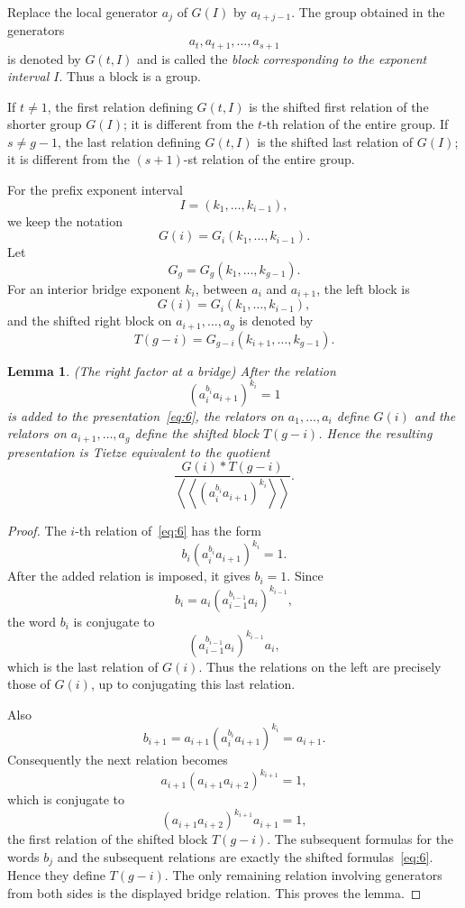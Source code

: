 \documentclass{article}
\newtheorem{lm}[theorem]{Lemma}
\begin{document}
Replace the local generator $a_j$ of $G(I)$ by $a_{t+j-1}$.  The group
obtained in the generators
\[
 a_t,a_{t+1},\ldots,a_{s+1}
\]
is denoted by $G(t,I)$ and is called the \emph{block corresponding to the
exponent interval $I$}.  Thus a block is a group.

If $t\ne1$, the first relation defining $G(t,I)$ is the shifted first
relation of the shorter group $G(I)$; it is different from the $t$-th
relation of the entire group. 
If $s\ne g-1$, the last relation defining $G(t,I)$ is the shifted last
relation of $G(I)$; it is different from the $(s+1)$-st relation of the entire
group. 

For the prefix exponent interval
\[
 I=(k_1,\ldots,k_{i-1}),
\]
we keep the notation
\[
 G(i)=G_i(k_1,\ldots,k_{i-1}).
\]
Let
\[
 G_g=G_g(k_1,\ldots,k_{g-1}).
\]
For an interior bridge exponent $k_i$, between $a_i$ and $a_{i+1}$, the
left block is
\[
 G(i)=G_i(k_1,\ldots,k_{i-1}),
\]
and the shifted right block on $a_{i+1},\ldots,a_g$ is denoted by
\[
 T(g-i)=G_{g-i}(k_{i+1},\ldots,k_{g-1}).
\]


\begin{lm} (The right factor at a bridge)
After the relation
\[
 (a_i^{b_i}a_{i+1})^{k_i}=1
\]
is added to the presentation~\eqref{eq:6}, the relators on
$a_1,\ldots,a_i$ define $G(i)$ and the relators on
$a_{i+1},\ldots,a_g$ define the shifted block $T(g-i)$.  Hence the
resulting presentation is Tietze equivalent to the quotient
\[
 \frac{G(i)*T(g-i)}
 {\left\langle\!\left\langle
 (a_i^{b_i}a_{i+1})^{k_i}
 \right\rangle\!\right\rangle}.
\]
\end{lm}
\begin{proof}
The $i$-th relation of~\eqref{eq:6} has the form
\[
 b_i(a_i^{b_i}a_{i+1})^{k_i}=1.
\]
After the added relation is imposed, it gives $b_i=1$.  Since
\[
 b_i=a_i(a_{i-1}^{b_{i-1}}a_i)^{k_{i-1}},
\]
the word $b_i$ is conjugate to
\[
 (a_{i-1}^{b_{i-1}}a_i)^{k_{i-1}}a_i,
\]
which is the last relation of $G(i)$.
  Thus the relations on the left are
precisely those of $G(i)$, up to conjugating this last relation.

Also
\[
 b_{i+1}=a_{i+1}(a_i^{b_i}a_{i+1})^{k_i}=a_{i+1}.
\]
Consequently the next relation becomes
\[
 a_{i+1}(a_{i+1}a_{i+2})^{k_{i+1}}=1,
\]
which is conjugate to
\[
 (a_{i+1}a_{i+2})^{k_{i+1}}a_{i+1}=1,
\]
the first relation of the shifted block $T(g-i)$.  The subsequent formulas
for the words $b_j$ and the subsequent relations are exactly the shifted
formulas~\eqref{eq:6}.  Hence they define $T(g-i)$.  The only remaining
relation involving generators from both sides is the displayed bridge
relation.  This proves the lemma.
\end{proof}
\end{document}
